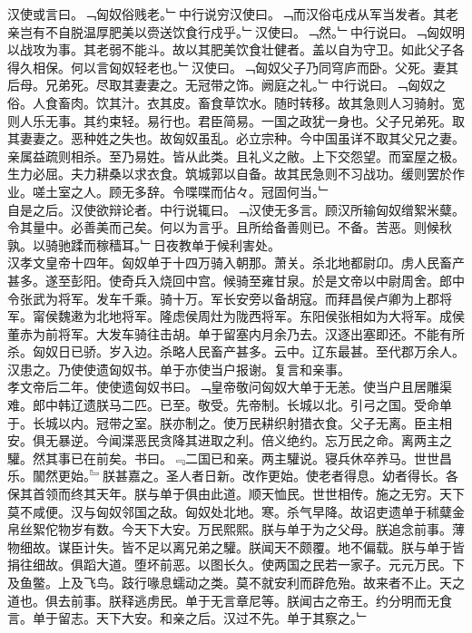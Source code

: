 \documentclass{zhvt-classic}
\begin{document}
\hspace*{2em}汉使或言曰。﹁匈奴俗贱老。﹂中行说穷汉使曰。﹁而汉俗屯戍从军当发者。其老亲岂有不自脱温厚肥美以赍送饮食行戍乎。﹂汉使曰。﹁然。﹂中行说曰。﹁匈奴明以战攻为事。其老弱不能斗。故以其肥美饮食壮健者。盖以自为守卫。如此父子各得久相保。何以言匈奴轻老也。﹂汉使曰。﹁匈奴父子乃同穹庐而卧。父死。妻其后母。兄弟死。尽取其妻妻之。无冠带之饰。阙庭之礼。﹂中行说曰。﹁匈奴之俗。人食畜肉。饮其汁。衣其皮。畜食草饮水。随时转移。故其急则人习骑射。宽则人乐无事。其约束轻。易行也。君臣简易。一国之政犹一身也。父子兄弟死。取其妻妻之。恶种姓之失也。故匈奴虽乱。必立宗种。今中国虽详不取其父兄之妻。亲属益疏则相杀。至乃易姓。皆从此类。且礼义之敝。上下交怨望。而室屋之极。生力必屈。夫力耕桑以求衣食。筑城郭以自备。故其民急则不习战功。缓则罢於作业。嗟土室之人。顾无多辞。令喋喋而佔々。冠固何当。﹂\\
\hspace*{2em}自是之后。汉使欲辩论者。中行说辄曰。﹁汉使无多言。顾汉所输匈奴缯絮米糵。令其量中。必善美而己矣。何以为言乎。且所给备善则已。不备。苦恶。则候秋孰。以骑驰蹂而稼穑耳。﹂日夜教单于候利害处。\\
\hspace*{2em}汉孝文皇帝十四年。匈奴单于十四万骑入朝那。萧关。杀北地都尉卬。虏人民畜产甚多。遂至彭阳。使奇兵入烧回中宫。候骑至雍甘泉。於是文帝以中尉周舍。郎中令张武为将军。发车千乘。骑十万。军长安旁以备胡寇。而拜昌侯卢卿为上郡将军。甯侯魏遫为北地将军。隆虑侯周灶为陇西将军。东阳侯张相如为大将军。成侯董赤为前将军。大发车骑往击胡。单于留塞内月余乃去。汉逐出塞即还。不能有所杀。匈奴日已骄。岁入边。杀略人民畜产甚多。云中。辽东最甚。至代郡万余人。汉患之。乃使使遗匈奴书。单于亦使当户报谢。复言和亲事。\\
\hspace*{2em}孝文帝后二年。使使遗匈奴书曰。﹁皇帝敬问匈奴大单于无恙。使当户且居雕渠难。郎中韩辽遗朕马二匹。已至。敬受。先帝制。长城以北。引弓之国。受命单于。长城以内。冠带之室。朕亦制之。使万民耕织射猎衣食。父子无离。臣主相安。俱无暴逆。今闻渫恶民贪降其进取之利。倍义绝约。忘万民之命。离两主之驩。然其事已在前矣。书曰。﹃二国已和亲。两主驩说。寝兵休卒养马。世世昌乐。闟然更始。﹄朕甚嘉之。圣人者日新。改作更始。使老者得息。幼者得长。各保其首领而终其天年。朕与单于俱由此道。顺天恤民。世世相传。施之无穷。天下莫不咸便。汉与匈奴邻国之敌。匈奴处北地。寒。杀气早降。故诏吏遗单于秫糵金帛丝絮佗物岁有数。今天下大安。万民熙熙。朕与单于为之父母。朕追念前事。薄物细故。谋臣计失。皆不足以离兄弟之驩。朕闻天不颇覆。地不偏载。朕与单于皆捐往细故。俱蹈大道。堕坏前恶。以图长久。使两国之民若一家子。元元万民。下及鱼鳖。上及飞鸟。跂行喙息蠕动之类。莫不就安利而辟危殆。故来者不止。天之道也。俱去前事。朕释逃虏民。单于无言章尼等。朕闻古之帝王。约分明而无食言。单于留志。天下大安。和亲之后。汉过不先。单于其察之。﹂\\
\end{document}
